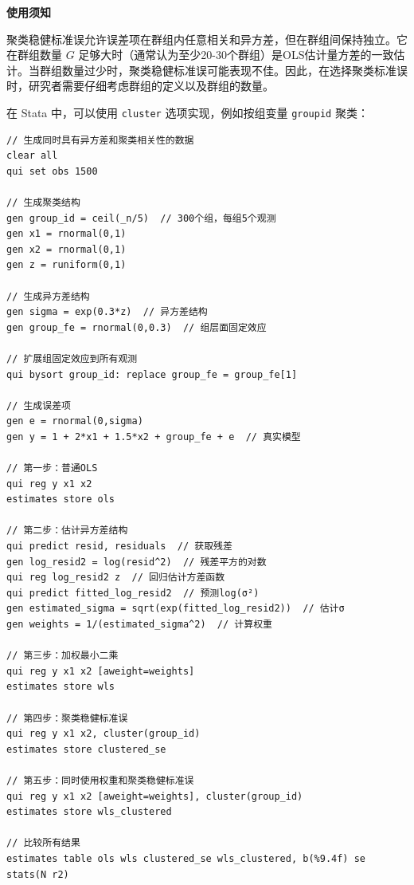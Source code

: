 \textbf{使用须知}

聚类稳健标准误允许误差项在群组内任意相关和异方差，但在群组间保持独立。它在群组数量 $G$ 足够大时（通常认为至少20-30个群组）是OLS估计量方差的一致估计。当群组数量过少时，聚类稳健标准误可能表现不佳。因此，在选择聚类标准误时，研究者需要仔细考虑群组的定义以及群组的数量。

在 Stata 中，可以使用 \texttt{cluster} 选项实现，例如按组变量 \texttt{groupid} 聚类：

\begin{tcolorbox}[title=在 Stata 中实现加权-聚类稳健标准误, colback=white, colframe=black, colbacktitle=white, coltitle=black,fonttitle=\bfseries]
	\begin{lstlisting}[xleftmargin=2em,
		basicstyle=\ttfamily\small\color{black},
		keywordstyle=\color{black},
		commentstyle=\color{black},
		stringstyle=\color{black},
		identifierstyle=\color{black},
		numberstyle=\color{black},
		showstringspaces=false,
		morekeywords={clear, set, seed, net, install, mc_ols_sim, from, replace, use, collapse, list, twoway, histogram, kdensity, line, title, legend, yline, xline, aspectratio, plotregion, graphregion, save, color, table}]
// 生成同时具有异方差和聚类相关性的数据
clear all
qui set obs 1500

// 生成聚类结构
gen group_id = ceil(_n/5)  // 300个组，每组5个观测
gen x1 = rnormal(0,1)
gen x2 = rnormal(0,1)
gen z = runiform(0,1)

// 生成异方差结构
gen sigma = exp(0.3*z)  // 异方差结构
gen group_fe = rnormal(0,0.3)  // 组层面固定效应

// 扩展组固定效应到所有观测
qui bysort group_id: replace group_fe = group_fe[1]

// 生成误差项
gen e = rnormal(0,sigma)
gen y = 1 + 2*x1 + 1.5*x2 + group_fe + e  // 真实模型

// 第一步：普通OLS
qui reg y x1 x2
estimates store ols

// 第二步：估计异方差结构
qui predict resid, residuals  // 获取残差
gen log_resid2 = log(resid^2)  // 残差平方的对数
qui reg log_resid2 z  // 回归估计方差函数
qui predict fitted_log_resid2  // 预测log(σ²)
gen estimated_sigma = sqrt(exp(fitted_log_resid2))  // 估计σ
gen weights = 1/(estimated_sigma^2)  // 计算权重

// 第三步：加权最小二乘
qui reg y x1 x2 [aweight=weights]
estimates store wls

// 第四步：聚类稳健标准误
qui reg y x1 x2, cluster(group_id)
estimates store clustered_se

// 第五步：同时使用权重和聚类稳健标准误
qui reg y x1 x2 [aweight=weights], cluster(group_id)
estimates store wls_clustered

// 比较所有结果
estimates table ols wls clustered_se wls_clustered, b(%9.4f) se stats(N r2)
\end{lstlisting}
\end{tcolorbox}

